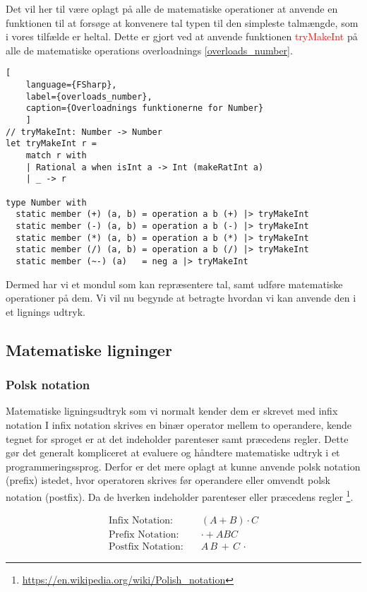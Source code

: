 \documentclass{article}
\begin{document}
Det vil her til være oplagt på alle de matematiske operationer at anvende en funktionen til at forsøge at konvenere tal typen til den simpleste talmængde, som i vores tilfælde er heltal. Dette er gjort ved at anvende funktionen \textcolor{red}{tryMakeInt} på alle de matematiske operations overloadnings \ref{overloads_number}.

\begin{lstlisting}[
    language={FSharp},
    label={overloads_number}, 
    caption={Overloadnings funktionerne for Number}
    ]
// tryMakeInt: Number -> Number
let tryMakeInt r =
    match r with
    | Rational a when isInt a -> Int (makeRatInt a)
    | _ -> r
    
type Number with
  static member (+) (a, b) = operation a b (+) |> tryMakeInt
  static member (-) (a, b) = operation a b (-) |> tryMakeInt
  static member (*) (a, b) = operation a b (*) |> tryMakeInt
  static member (/) (a, b) = operation a b (/) |> tryMakeInt
  static member (~-) (a)   = neg a |> tryMakeInt
\end{lstlisting}

Dermed har vi et mondul som kan repræsentere tal, samt udføre matematiske operationer på dem. Vi vil nu begynde at betragte hvordan vi kan anvende den i et lignings udtryk.

\subsection{Matematiske ligninger}
\subsubsection{Polsk notation}
Matematiske ligningsudtryk som vi normalt kender dem er skrevet med infix notation I infix notation skrives en binær operator mellem to operandere, kende tegnet for sproget er at det indeholder parenteser samt præcedens regler. Dette gør det generalt kompliceret at evaluere og håndtere matematiske udtryk i et programmeringssprog. Derfor er det mere oplagt at kunne anvende polsk notation (prefix) istedet, hvor operatoren skrives før operandere eller omvendt polsk notation (postfix). Da de hverken indeholder parenteser eller præcedens regler \footnote{\url{https://en.wikipedia.org/wiki/Polish_notation}}. 

\begin{align*}
    \text{Infix Notation:} \quad & (A + B) \cdot C \\
    \text{Prefix Notation:} \quad &  \cdot + A B C  \\
    \text{Postfix Notation:} \quad & A \, B \, + \, C \, \cdot
\end{align*}
\end{document}
